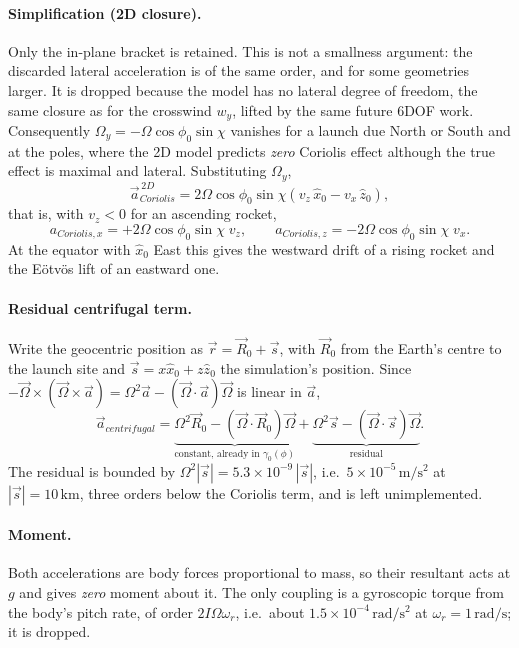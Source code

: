 \paragraph{Simplification (2D closure).} Only the in-plane bracket is retained. This is not a
smallness argument: the discarded lateral acceleration is of the same order, and for some
geometries larger. It is dropped because the model has no lateral degree of freedom, the same
closure as for the crosswind $w_y$, lifted by the same future 6DOF work. Consequently
$\Omega_y=-\Omega\cos\phi_0\sin\chi$ vanishes for a launch due North or South and at the poles,
where the 2D model predicts \emph{zero} Coriolis effect although the true effect is maximal and
lateral. Substituting $\Omega_y$,
\begin{equation} \label{eq:coriolis_2d}
    \vec{a}_{Coriolis}^{\,2D} = 2\Omega\cos\phi_0\sin\chi\left(v_z\,\hat{x}_0 - v_x\,\hat{z}_0\right),
\end{equation}
that is, with $v_z<0$ for an ascending rocket,
\begin{equation}
    a_{Coriolis,x} = +2\Omega\cos\phi_0\sin\chi\;v_z, \qquad
    a_{Coriolis,z} = -2\Omega\cos\phi_0\sin\chi\;v_x.
\end{equation}
At the equator with $\hat{x}_0$ East this gives the westward drift of a rising rocket and the
E\"otv\"os lift of an eastward one.

\paragraph{Residual centrifugal term.} Write the geocentric position as $\vec{r}=\vec{R}_0+\vec{s}$,
with $\vec{R}_0$ from the Earth's centre to the launch site and $\vec{s}=x\hat{x}_0+z\hat{z}_0$ the
simulation's position. Since $-\vec{\Omega}\times(\vec{\Omega}\times\vec{a})=\Omega^2\vec{a}-
(\vec{\Omega}\cdot\vec{a})\vec{\Omega}$ is linear in $\vec{a}$,
\begin{equation}
    \vec{a}_{centrifugal} = \underbrace{\Omega^2\vec{R}_0-(\vec{\Omega}\cdot\vec{R}_0)\vec{\Omega}}
        _{\text{constant, already in }\gamma_0(\phi)}
        + \underbrace{\Omega^2\vec{s}-(\vec{\Omega}\cdot\vec{s})\vec{\Omega}}_{\text{residual}}.
\end{equation}
The residual is bounded by $\Omega^2|\vec{s}|=5.3\times10^{-9}\,|\vec{s}|$, i.e.\
$5\times10^{-5}\,\mathrm{m/s^2}$ at $|\vec{s}|=10\,\mathrm{km}$, three orders below the Coriolis
term, and is left unimplemented.

\paragraph{Moment.} Both accelerations are body forces proportional to mass, so their resultant acts
at $g$ and gives \emph{zero} moment about it. The only coupling is a gyroscopic torque from the
body's pitch rate, of order $2I\Omega\omega_r$, i.e.\ about $1.5\times10^{-4}\,\mathrm{rad/s^2}$ at
$\omega_r=1\,\mathrm{rad/s}$; it is dropped.

